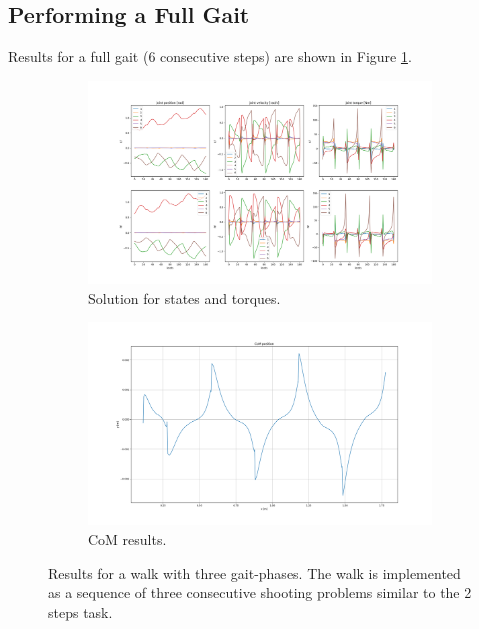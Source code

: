 \subsection{Performing a Full Gait}
Results for a full gait (6 consecutive steps) are shown in Figure \ref{fig:rh5_full_gait}.
\begin{figure}[h!]
\centering
\begin{subfigure}{.8\textwidth}
  \centering
  \includegraphics[width=1\linewidth]{Media/Crocoddyl/RH5/RH5Gait_Solution.png}
  \caption{Solution for states and torques.}
\end{subfigure}
\begin{subfigure}{.8\textwidth}
  \centering
\includegraphics[width=1\linewidth]{Media/Crocoddyl/RH5/RH5Gait_CoM.png}
\caption{CoM results.}
\end{subfigure}
\caption{Results for a walk with three gait-phases. The walk is implemented as a sequence of three  consecutive shooting problems similar to the 2 steps task.}
\label{fig:rh5_full_gait}
\centering
\end{figure}

